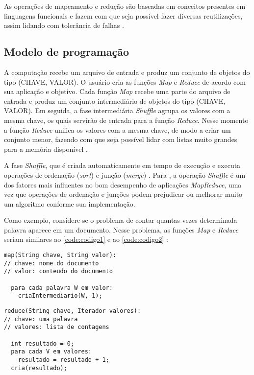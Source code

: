 As operações de mapeamento e redução são baseadas em conceitos presentes em linguagens funcionais e fazem com que seja possível fazer diversas reutilizações, assim lidando com tolerância de falhas \cite{MapReduce08}.

\subsection{Modelo de programação}\label{ssec:mapreducemodelo}

A computação recebe um arquivo de entrada e produz um conjunto de objetos do tipo (CHAVE, VALOR). O usuário cria as funções \textit{Map} e \textit{Reduce} de acordo com sua aplicação e objetivo. Cada função \textit{Map} recebe uma parte do arquivo de entrada e produz um conjunto intermediário de objetos do tipo (CHAVE, VALOR). Em seguida, a fase intermediária \textit{Shuffle} agrupa os valores com a mesma chave, os quais servirão de entrada para a função \textit{Reduce}. Nesse momento a função \textit{Reduce} unifica os valores com a mesma chave, de modo a criar um conjunto menor, fazendo com que seja possível lidar com listas muito grandes para a memória disponível \cite{MapReduce08}. 

A fase \textit{Shuffle}, que é criada automaticamente em tempo de execução e executa operações de ordenação (\textit{sort}) e junção (\textit{merge}) \cite{ProHadoop09}. Para \textcite{HadoopBook15}, a operação \textit{Shuffle} é um dos fatores mais influentes no bom desempenho de aplicações \textit{MapReduce}, uma vez que operações de ordenação e junções podem prejudicar ou melhorar muito um algoritmo conforme sua implementação.

Como exemplo, considere-se o problema de contar quantas vezes determinada palavra aparece em um documento. Nesse problema, as funções \textit{Map} e \textit{Reduce} seriam similares ao \autoref{code:codigo1} e ao \autoref{code:codigo2} \cite{MapReduce08}:

\begin{lstlisting}[caption={Exemplo de função Map em pseudocódigo adaptado de \cite{MapReduce08}}, label=code:codigo1]
map(String chave, String valor):
// chave: nome do documento
// valor: conteudo do documento

  para cada palavra W em valor:
    criaIntermediario(W, 1);
\end{lstlisting}

\begin{lstlisting}[caption={Exemplo de função Reduce em pseudocódigo adaptado de \cite{MapReduce08}}, label=code:codigo2]
reduce(String chave, Iterador valores):
// chave: uma palavra
// valores: lista de contagens

  int resultado = 0;
  para cada V em valores:
    resultado = resultado + 1;
  cria(resultado);
\end{lstlisting}

